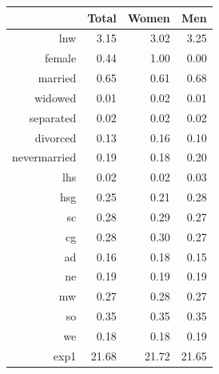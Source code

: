 \begin{table}[ht]
\centering
\begin{tabular}{rrrr}
  \hline
 & Total & Women & Men \\ 
  \hline
lnw & 3.15 & 3.02 & 3.25 \\ 
  female & 0.44 & 1.00 & 0.00 \\ 
  married & 0.65 & 0.61 & 0.68 \\ 
  widowed & 0.01 & 0.02 & 0.01 \\ 
  separated & 0.02 & 0.02 & 0.02 \\ 
  divorced & 0.13 & 0.16 & 0.10 \\ 
  nevermarried & 0.19 & 0.18 & 0.20 \\ 
  lhs & 0.02 & 0.02 & 0.03 \\ 
  hsg & 0.25 & 0.21 & 0.28 \\ 
  sc & 0.28 & 0.29 & 0.27 \\ 
  cg & 0.28 & 0.30 & 0.27 \\ 
  ad & 0.16 & 0.18 & 0.15 \\ 
  ne & 0.19 & 0.19 & 0.19 \\ 
  mw & 0.27 & 0.28 & 0.27 \\ 
  so & 0.35 & 0.35 & 0.35 \\ 
  we & 0.18 & 0.18 & 0.19 \\ 
  exp1 & 21.68 & 21.72 & 21.65 \\ 
   \hline
\end{tabular}
\end{table}
